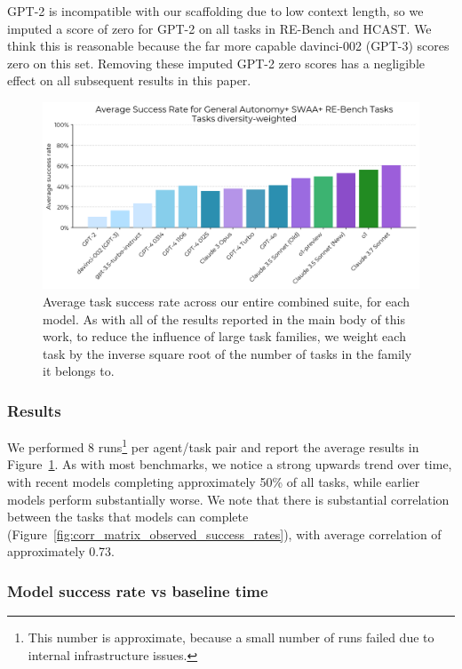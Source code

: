 \documentclass{article}
\newcommand{\gabenchmark}{HCAST}
\begin{document}
GPT-2 is incompatible with our scaffolding due to low context length, so we imputed a score of zero for GPT-2 on all tasks in RE-Bench and \gabenchmark{}. We think this is reasonable because the far more capable davinci-002 (GPT-3) scores zero on this set. Removing these imputed GPT-2 zero scores has a negligible effect on all subsequent results in this paper. 

\begin{figure}
    \centering
    \includegraphics[width=0.8\linewidth]{plots/bar_chart_weighted_scores/headline.png}
    \caption{Average task success rate across our entire combined suite, for each model. As with all of the results reported in the main body of this work, to reduce the influence of large task families, we weight each task by the inverse square root of the number of tasks in the family it belongs to.}
    \label{fig:scores}

\end{figure}

\subsubsection{Results}
We performed 8 runs\footnote{This number is approximate, because a small number of runs failed due to internal infrastructure issues.} per agent/task pair and report the average results in Figure~\ref{fig:scores}. As with most benchmarks, we notice a strong upwards trend over time, with recent models completing approximately 50\% of all tasks, while earlier models perform substantially worse. We note that there is substantial correlation between the tasks that models can complete (Figure~\ref{fig:corr_matrix_observed_success_rates}), with average correlation of approximately 0.73. 


\subsubsection{Model success rate vs baseline time}
\end{document}
